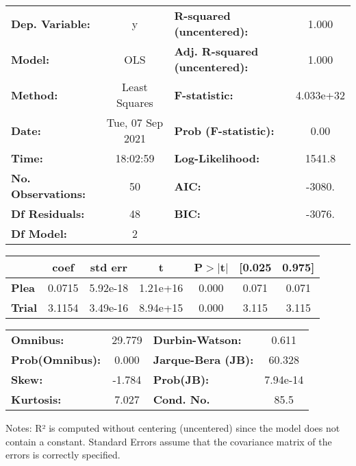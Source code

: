 \begin{center}
\begin{tabular}{lclc}
\toprule
\textbf{Dep. Variable:}    &        y         & \textbf{  R-squared (uncentered):}      &     1.000   \\
\textbf{Model:}            &       OLS        & \textbf{  Adj. R-squared (uncentered):} &     1.000   \\
\textbf{Method:}           &  Least Squares   & \textbf{  F-statistic:       }          & 4.033e+32   \\
\textbf{Date:}             & Tue, 07 Sep 2021 & \textbf{  Prob (F-statistic):}          &     0.00    \\
\textbf{Time:}             &     18:02:59     & \textbf{  Log-Likelihood:    }          &    1541.8   \\
\textbf{No. Observations:} &          50      & \textbf{  AIC:               }          &    -3080.   \\
\textbf{Df Residuals:}     &          48      & \textbf{  BIC:               }          &    -3076.   \\
\textbf{Df Model:}         &           2      & \textbf{                     }          &             \\
\bottomrule
\end{tabular}
\begin{tabular}{lcccccc}
               & \textbf{coef} & \textbf{std err} & \textbf{t} & \textbf{P$> |$t$|$} & \textbf{[0.025} & \textbf{0.975]}  \\
\midrule
\textbf{Plea}  &       0.0715  &     5.92e-18     &  1.21e+16  &         0.000        &        0.071    &        0.071     \\
\textbf{Trial} &       3.1154  &     3.49e-16     &  8.94e+15  &         0.000        &        3.115    &        3.115     \\
\bottomrule
\end{tabular}
\begin{tabular}{lclc}
\textbf{Omnibus:}       & 29.779 & \textbf{  Durbin-Watson:     } &    0.611  \\
\textbf{Prob(Omnibus):} &  0.000 & \textbf{  Jarque-Bera (JB):  } &   60.328  \\
\textbf{Skew:}          & -1.784 & \textbf{  Prob(JB):          } & 7.94e-14  \\
\textbf{Kurtosis:}      &  7.027 & \textbf{  Cond. No.          } &     85.5  \\
\bottomrule
\end{tabular}
\end{center}

Notes: \newline
 [1] R² is computed without centering (uncentered) since the model does not contain a constant. \newline
 [2] Standard Errors assume that the covariance matrix of the errors is correctly specified.